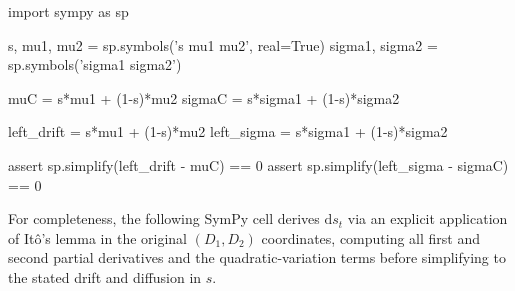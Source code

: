 ﻿\documentclass[11pt,letterpaper,oneside]{article}
\numberwithin{equation}{section}
\newcommand{\1}{\mathbf{1}}
\newcommand{\diff}{\mathrm{d}}
\begin{document}
\begin{sympycheck}[title={Verification: Consumption dynamics}]
\begin{pyconsole}
import sympy as sp

s, mu1, mu2 = sp.symbols('s mu1 mu2', real=True)
sigma1, sigma2 = sp.symbols('sigma1 sigma2')

muC = s*mu1 + (1-s)*mu2
sigmaC = s*sigma1 + (1-s)*sigma2

left_drift = s*mu1 + (1-s)*mu2
left_sigma = s*sigma1 + (1-s)*sigma2

assert sp.simplify(left_drift - muC) == 0
assert sp.simplify(left_sigma - sigmaC) == 0
\end{pyconsole}
\end{sympycheck}

For completeness, the following SymPy cell derives $\diff s_t$ via an explicit application of It\^o's lemma in the original $(D_1,D_2)$ coordinates, computing all first and second partial derivatives and the quadratic-variation terms before simplifying to the stated drift and diffusion in $s$.
\end{document}
